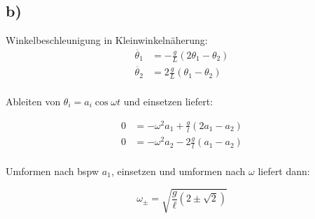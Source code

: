 \documentclass{scrartcl}
\begin{document}
\subsection*{b)}
Winkelbeschleunigung in Kleinwinkelnäherung:
\begin{align*}
	\ddot{\theta_1} &= -\frac{g}{L} \left(2 \theta_1 - \theta_2 \right) \\
	\ddot{\theta_2} &= 2 \frac{g}{L} \left( \theta_1 - \theta_2 \right) \\
\end{align*}

Ableiten von $\theta_i = a_i \cos{\omega t}$ und einsetzen liefert:

\begin{align*}
	0 &= - \omega^2 a_1 + \frac g l \left( 2 a_1-a_2\right)  \\
	0 &= - \omega^2 a_2 - 2 \frac g l \left(a_1-a_2\right)  \\
\end{align*}

Umformen nach bspw $a_1$, einsetzen und umformen nach $\omega$ liefert dann:


\begin{equation*}
	 \omega _ { \pm } = \sqrt { \frac { g } { \ell } ( 2 \pm \sqrt { 2 } ) } 
\end{equation*}
\end{document}
